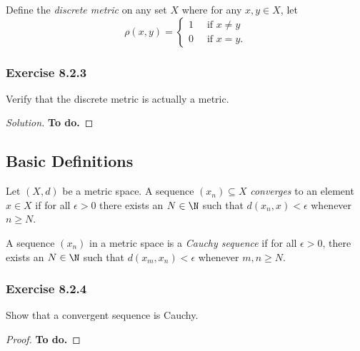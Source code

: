 Define the \textit{discrete metric} on any set \( X  \) where for any \( x, y \in X  \), let 
\[  \rho (x,y) = 
\begin{cases}
    1 \  &\text{ if } x \neq y \\
    0 \ &\text{ if } x = y.
\end{cases}  \]

\subsubsection{Exercise 8.2.3} Verify that the discrete metric is actually a metric.
\begin{proof}[Solution]
    \textbf{To do.}
\end{proof}

\subsection{Basic Definitions}

\begin{tcolorbox}
\begin{defn}
Let \( (X,d)  \) be a metric space. A sequence \( (x_{n}) \subseteq  X  \) \textit{converges} to an element \( x \in X  \) if for all \( \epsilon > 0  \) there exists an \( N \in \N  \) such that \( d(x_{n} ,x )  < \epsilon \) whenever \( n \geq N  \).
\end{defn}
\end{tcolorbox}


\begin{tcolorbox}
\begin{defn}
A sequence \( (x_{n}) \) in a metric space is a \textit{Cauchy sequence} if for all \( \epsilon > 0  \), there exists an \( N \in \N  \) such that \( d(x_{m}, x_{n}) < \epsilon \) whenever \( m, n \geq N  \).
\end{defn} 
\end{tcolorbox}

\subsubsection{Exercise 8.2.4} Show that a convergent sequence is Cauchy.
\begin{proof}
    \textbf{To do.}
\end{proof}














